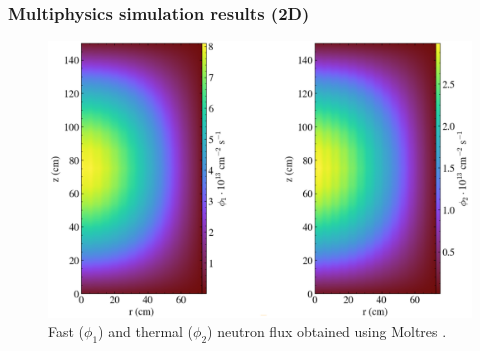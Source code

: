 \begin{frame}
  \frametitle{Multiphysics simulation results (2D)}
  \begin{figure}
   \vspace{-0.05in}
   \hspace*{-0.15in}
   \includegraphics[height=0.85\textheight]{./images/moltres_flux.png}
   \vspace{-0.1in}
   \caption{Fast ($\phi_1$) and thermal ($\phi_2$) neutron flux obtained using Moltres 			\cite{lindsay_introduction_2018}.}
    \end{figure}
\end{frame}

